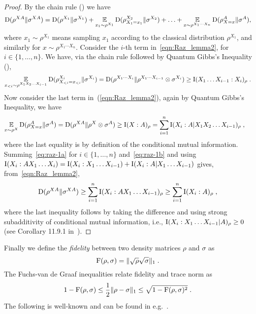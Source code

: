 \begin{proof}
By the chain rule () we have 
\begin{equation}\label{eqn:Raz_lemma2}
\mathrm{D}(\rho^{XA} \| \sigma^{XA})= \mathrm{D}(\rho^{X_1} \| \sigma^{X_1}) + \operatorname*{\mathbb{E}}_{x_1 \sim \rho^{X_1}} \mathrm{D}(\rho^{X_2}_{X_1=x_1}\| \sigma^{X_2}) + \ldots+ \operatorname*{\mathbb{E}}_{x \sim \rho^{X_1 \cdots X_n}} \mathrm{D}(\rho^{A}_{X=x} \| \sigma^{A}),
\end{equation}
where $x_1 \sim \rho^{X_1}$ means sampling $x_1$ according to the classical distribution $\rho^{X_1}$, and similarly for $x \sim \rho^{X_1 \cdots X_n}$. Consider the $i$-th term in~\eqref{eqn:Raz_lemma2}, for $i\in\{1,\ldots,n\}$. We have, via the chain rule followed by Quantum Gibbs's Inequality (), 
\begin{equation}\label{eq:raz-1a}
\operatorname*{\mathbb{E}}_{x_{<i}\sim \rho^{X_1X_2\ldots X_{i-1}}} \mathrm{D}(\rho^{X_i}_{X_{< i}= x_{<i}} \| \sigma^{X_i}) = \mathrm{D}(\rho^{X_1 \cdots X_i} \|\rho^{X_1 \cdots X_{i-1}} \otimes \sigma^{X_i}) \geq  \mathrm{I}(X_1\ldots X_{i-1} : X_i)_\rho\;.
\end{equation}
Now consider the last term in~(\ref{eqn:Raz_lemma2}), again by Quantum Gibbs's Inequality, we have
\begin{align}
\operatorname*{\mathbb{E}}_{x\sim \rho^X} \mathrm{D}(\rho^{A}_{X=x} \|\sigma^{A}) &= \mathrm{D}(\rho^{XA} \| \rho^X \otimes \sigma^A) \geq \mathrm{I}(X:A)_\rho = \sum_{i=1}^n \mathrm{I}(X_i : A| X_1 X_2 \ldots X_{i-1})_\rho\;,\label{eq:raz-1b}
\end{align}
where the last equality is by definition of the conditional mutual information. 
Summing~\eqref{eq:raz-1a} for $i\in\{1,\ldots,n\}$ and~\eqref{eq:raz-1b} and using $\mathrm{I}(X_i:A X_1\ldots X_i)= \mathrm{I}(X_i:X_1\ldots X_{i-1})+ \mathrm{I}(X_i:A|X_1\ldots X_{i-1})$ gives, from~\eqref{eqn:Raz_lemma2},
\[ \mathrm{D}(\rho^{X A} \| \sigma^{XA})\geq \sum_{i=1}^n \mathrm{I}(X_i: A X_1 \ldots X_{i-1})_\rho \geq \sum_{i=1}^n \mathrm{I}(X_i:A)_\rho\;,
\]
where the last inequality follows by taking the difference and using strong subadditivity of conditional mutual information, i.e., $\mathrm{I}(X_i:X_1\ldots X_{i-1}|A)_\rho\geq 0$ (see Corollary 11.9.1 in~\cite{wilde2013quantum}). 
\end{proof}

Finally we define the \emph{fidelity} between two density matrices $\rho$ and $\sigma$ as 
\[\mathrm{F}(\rho,\sigma) = \| \sqrt{\rho} \sqrt{\sigma} \|_1\;.\]
The Fuchs-van de Graaf inequalities relate fidelity and trace norm as
\begin{equation}\label{eq:fuchs-graaf}
1 - \mathrm{F}(\rho,\sigma) \leq \frac{1}{2} \| \rho - \sigma \|_1 \leq \sqrt{1 - \mathrm{F}(\rho,\sigma)^2}\;.
\end{equation}
The following is well-known and can be found in e.g.~\cite{wilde2013quantum}.

